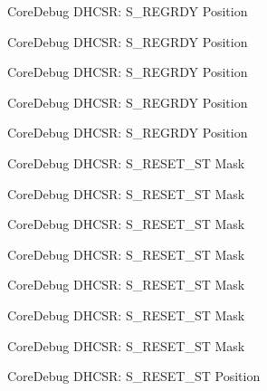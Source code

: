 \begin{DoxyRefList}
\label{deprecated__deprecated000173}%
%
Core\+Debug D\+H\+C\+SR\+: S\+\_\+\+R\+E\+G\+R\+DY Position 

\label{deprecated__deprecated000258}%
%
Core\+Debug D\+H\+C\+SR\+: S\+\_\+\+R\+E\+G\+R\+DY Position 

\label{deprecated__deprecated000315}%
%
Core\+Debug D\+H\+C\+SR\+: S\+\_\+\+R\+E\+G\+R\+DY Position 

\label{deprecated__deprecated000391}%
%
Core\+Debug D\+H\+C\+SR\+: S\+\_\+\+R\+E\+G\+R\+DY Position 

\label{deprecated__deprecated000478}%
%
Core\+Debug D\+H\+C\+SR\+: S\+\_\+\+R\+E\+G\+R\+DY Position  
\item[Member \mbox{\hyperlink{group__CMSIS__CoreDebug_gac474394bcceb31a8e09566c90b3f8922}{Core\+Debug\+\_\+\+D\+H\+C\+S\+R\+\_\+\+S\+\_\+\+R\+E\+S\+E\+T\+\_\+\+S\+T\+\_\+\+Msk}} ]\label{deprecated__deprecated000010}%
%
Core\+Debug D\+H\+C\+SR\+: S\+\_\+\+R\+E\+S\+E\+T\+\_\+\+ST Mask 

\label{deprecated__deprecated000110}%
%
Core\+Debug D\+H\+C\+SR\+: S\+\_\+\+R\+E\+S\+E\+T\+\_\+\+ST Mask 

\label{deprecated__deprecated000164}%
%
Core\+Debug D\+H\+C\+SR\+: S\+\_\+\+R\+E\+S\+E\+T\+\_\+\+ST Mask 

\label{deprecated__deprecated000249}%
%
Core\+Debug D\+H\+C\+SR\+: S\+\_\+\+R\+E\+S\+E\+T\+\_\+\+ST Mask 

\label{deprecated__deprecated000306}%
%
Core\+Debug D\+H\+C\+SR\+: S\+\_\+\+R\+E\+S\+E\+T\+\_\+\+ST Mask 

\label{deprecated__deprecated000382}%
%
Core\+Debug D\+H\+C\+SR\+: S\+\_\+\+R\+E\+S\+E\+T\+\_\+\+ST Mask 

\label{deprecated__deprecated000461}%
%
Core\+Debug D\+H\+C\+SR\+: S\+\_\+\+R\+E\+S\+E\+T\+\_\+\+ST Mask  
\item[Member \mbox{\hyperlink{group__CMSIS__CoreDebug_ga6f934c5427ea057394268e541fa97753}{Core\+Debug\+\_\+\+D\+H\+C\+S\+R\+\_\+\+S\+\_\+\+R\+E\+S\+E\+T\+\_\+\+S\+T\+\_\+\+Pos}} ]\label{deprecated__deprecated000009}%
%
Core\+Debug D\+H\+C\+SR\+: S\+\_\+\+R\+E\+S\+E\+T\+\_\+\+ST Position 


\end{DoxyRefList}
